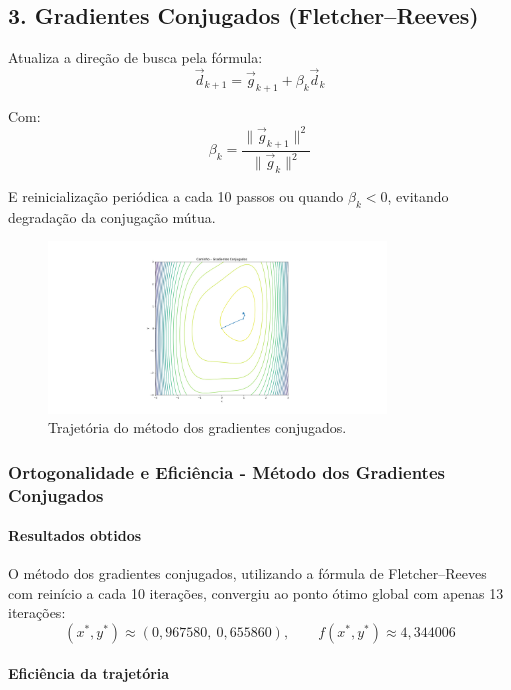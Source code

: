 \documentclass[12pt]{article}
\begin{document}
\subsection*{3. Gradientes Conjugados (Fletcher--Reeves)}

Atualiza a direção de busca pela fórmula:
\begin{equation}
    \vec{d}_{k+1} = \vec{g}_{k+1} + \beta_k \vec{d}_k
\end{equation}

Com:
\begin{equation}
    \beta_k = \frac{\|\vec{g}_{k+1}\|^2}{\|\vec{g}_k\|^2}
\end{equation}

E reinicialização periódica a cada 10 passos ou quando $\beta_k < 0$, evitando degradação da conjugação mútua.

\begin{figure}
    \centering
    \includegraphics[width=0.8\textwidth]{img/GC.png}
    \caption{Trajetória do método dos gradientes conjugados.}
\end{figure}

\subsubsection*{Ortogonalidade e Eficiência - Método dos Gradientes Conjugados}

\paragraph{Resultados obtidos}

O método dos gradientes conjugados, utilizando a fórmula de Fletcher–Reeves com reinício a cada 10 iterações, convergiu ao ponto ótimo global com apenas 13 iterações:
\[
(x^*, y^*) \approx (0{,}967580,\ 0{,}655860), \qquad f(x^*, y^*) \approx 4{,}344006
\]

\paragraph{Eficiência da trajetória}
\end{document}
